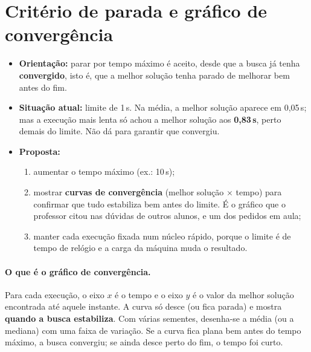 \documentclass[11pt,a4paper]{article}
\begin{document}
\section{Critério de parada e gráfico de convergência}\label{sec:parada}
\begin{itemize}[leftmargin=*,itemsep=2pt]
\item \textbf{Orientação:} parar por tempo máximo é aceito, desde que a busca já tenha \textbf{convergido}, isto é,
  que a melhor solução tenha parado de melhorar bem antes do fim.
\item \textbf{Situação atual:} limite de 1\,s. Na média, a melhor solução aparece em 0,05\,s; mas a execução mais
  lenta só achou a melhor solução aos \textbf{0,83\,s}, perto demais do limite. Não dá para garantir que
  convergiu.
\item \textbf{Proposta:}
  \begin{enumerate}[itemsep=0pt]
  \item aumentar o tempo máximo (ex.: 10\,s);
  \item mostrar \textbf{curvas de convergência} (melhor solução $\times$ tempo) para confirmar que tudo estabiliza bem
    antes do limite. É o gráfico que o professor citou nas dúvidas de outros alunos, e um dos pedidos em aula;
  \item manter cada execução fixada num núcleo rápido, porque o limite é de tempo de relógio e a carga da máquina
    muda o resultado.
  \end{enumerate}
\end{itemize}

\paragraph{O que é o gráfico de convergência.} Para cada execução, o eixo $x$ é o tempo e o eixo $y$ é o valor da
melhor solução encontrada até aquele instante. A curva só desce (ou fica parada) e mostra \textbf{quando a busca
estabiliza}. Com várias sementes, desenha-se a média (ou a mediana) com uma faixa de variação. Se a curva fica
plana bem antes do tempo máximo, a busca convergiu; se ainda desce perto do fim, o tempo foi curto.

\begin{center}
\end{center}
\end{document}

